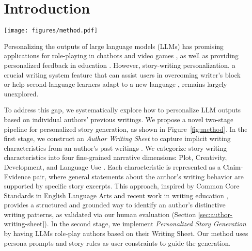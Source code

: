 \section{Introduction}

\begin{figure*}[htbp]
\centering
\texttt{[image: figures/method.pdf]}
\caption{Our two-stage pipeline for personalized story generation. Stage 1 constructs an Author Writing Sheet with Claim ($C$) and Evidence ($E$) pairs capturing the author’s story-writing characteristics across narrative categories. It is derived from the author’s history of writing prompts ($wp$), author-written stories ($s_a$), and LLM-generated Average Stories ($s_b$) representing a typical author's response to the same prompt. Stage 2 uses the Author Writing Sheet to role-play the author, incorporating tailored story rules and a persona description for personalized generation.} 
\label{fig:method}
\end{figure*}


Personalizing the outputs of large language models (LLMs) has promising applications for role-playing in chatbots and video games \citep{tseng-etal-2024-two, chen2024persona}, as well as providing personalized feedback in education \citep{stahl-etal-2024-exploring, li-etal-2024-using, makridis2024fairylandai}. However, story-writing personalization, a crucial writing system feature that can assist users in overcoming writer’s block or help second-language learners adapt to a new language \citep{yuan2022wordcraft, yeh2024ghostwriter}, remains largely unexplored. 

To address this gap, we systematically explore how to personalize LLM outputs based on individual authors' previous writings. We propose a novel two-stage pipeline for personalized story generation, as shown in Figure~\ref{fig:method}. In the first stage, we construct an \textit{Author Writing Sheet} to capture implicit writing characteristics from an author's past writings \citep{sun-etal-2025-persona, sun-etal-2024-revealing, ramos-etal-2024-transparent}. We categorize story-writing characteristics into four fine-grained narrative dimensions: Plot, Creativity, Development, and Language Use \citep{pavis1998dictionary, card1999characters, noble1994conflict, huot2024agents}. Each characteristic is represented as a Claim-Evidence pair, where general statements about the author's writing behavior are supported by specific story excerpts. This approach, inspired by Common Core Standards in English Language Arts \citep{national2010common} and recent work in writing education \citep{li2023teach}, provides a structured and grounded way to identify an author's distinctive writing patterns, as validated via our human evaluation (Section \ref{sec:author-writing-sheet}). In the second stage, we implement \textit{Personalized Story Generation} by having LLMs role-play authors based on their Writing Sheet. Our method uses persona prompts and story rules as user constraints to guide the generation. 

